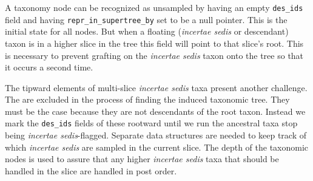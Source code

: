 \documentclass[english]{article}
\newcommand{\incsed}[0]{{\em incertae sedis}\xspace}
\begin{document}
A taxonomy node can be recognized as unsampled by having an empty \texttt{des\_ids}
    field and having \texttt{repr\_in\_supertree\_by} set to be a null pointer.
This is the initial state for all nodes.
But when a floating (\incsed or descendant) taxon is in a higher slice in the tree
    this field will point to that slice's root.
This is necessary to prevent grafting on the \incsed taxon onto the tree so that it
    occurs a second time.

The tipward elements of multi-slice \incsed taxa present another challenge.
The are excluded in the process of finding the induced taxonomic tree.
They must be the case because they are not descendants of the root taxon.
Instead we mark the \texttt{des\_ids} fields of these rootward until
    we run the ancestral taxa stop being \incsed-flagged.
Separate data structures are needed to keep track of which \incsed are sampled
    in the current slice.
The depth of the taxonomic nodes is used to assure that any higher \incsed taxa
    that should be handled in the slice are handled in post order.
\end{document}
